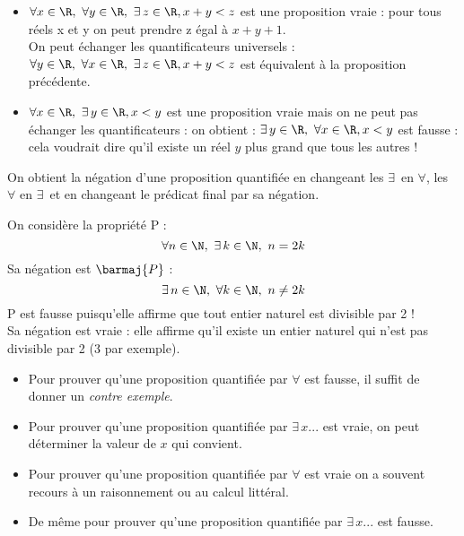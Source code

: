 \begin{exemple}[s]
	\begin{itemize}
		\item 	$\forall x\in\R,\ \forall y\in\R,\ \exists\, z \in\R, x+y<z$ est une proposition vraie : pour tous réels x et y on peut prendre z égal à $x+y+1$.\\
		      On peut échanger les quantificateurs universels : $\forall y\in\R,\ \forall x\in\R,\ \exists\, z \in\R, x+y<z$ est équivalent à la proposition précédente.
		\item 	$\forall x\in\R,\ \exists\, y \in\R, x<y$ est une proposition vraie mais on ne peut pas échanger les quantificateurs : on obtient :
		      $\exists\, y\in\R,\ \forall x \in\R, x<y$ est fausse : cela voudrait dire qu'il existe un réel $y$ plus grand que tous les autres !
	\end{itemize}
\end{exemple}

\begin{propriete}
	On obtient la négation d'une proposition quantifiée en changeant les $\exists\,$ en $\forall$, les $\forall$ en $\exists\,$ et en changeant le prédicat final par sa négation.
\end{propriete}

\begin{exemple}[]
	On considère la propriété P : $$\forall n\in\N,\ \exists\, k\in\N,\ n=2k$$
	Sa négation est $\barmaj{P}$ :  $$\exists\, n\in\N,\ \forall k\in\N,\ n\neq 2k$$
	P est fausse puisqu'elle affirme que tout entier naturel est divisible par 2 !\\ Sa négation est vraie : elle affirme qu'il existe un entier naturel qui n'est pas divisible par 2 (3 par exemple).
\end{exemple}

\begin{methode}
	\begin{itemize}
		\item 	Pour prouver qu'une proposition quantifiée par $\forall$ est fausse, il suffit de donner un \textit{contre exemple}.
		\item 	Pour prouver qu'une proposition quantifiée par $\exists\, x...$ est vraie, on peut déterminer la valeur de $x$ qui convient.
		\item 	Pour prouver qu'une proposition quantifiée par $\forall$ est vraie on a souvent recours à un raisonnement ou au calcul littéral.
		\item 	De même pour prouver qu'une proposition quantifiée par $\exists\, x...$ est fausse.
	\end{itemize}
\end{methode}

